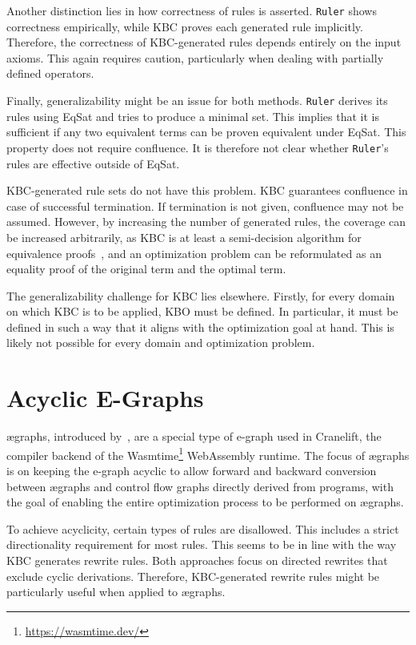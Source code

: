 Another distinction lies in how correctness of rules is asserted. \texttt{Ruler} shows correctness empirically, while KBC proves each generated rule implicitly. Therefore, the correctness of KBC-generated rules depends entirely on the input axioms. This again requires caution, particularly when dealing with partially defined operators.

Finally, generalizability might be an issue for both methods. \texttt{Ruler} derives its rules using EqSat and tries to produce a minimal set. This implies that it is sufficient if any two equivalent terms can be proven equivalent under EqSat. This property does not require confluence. It is therefore not clear whether \texttt{Ruler}'s rules are effective outside of EqSat.

KBC-generated rule sets do not have this problem. KBC guarantees confluence in case of successful termination. If termination is not given, confluence may not be assumed. However, by increasing the number of generated rules, the coverage can be increased arbitrarily, as KBC is at least a semi-decision algorithm for equivalence proofs~\citep{10.1093/comjnl/34.1.2}, and an optimization problem can be reformulated as an equality proof of the original term and the optimal term.

The generalizability challenge for KBC lies elsewhere. Firstly, for every domain on which KBC is to be applied, KBO must be defined. In particular, it must be defined in such a way that it aligns with the optimization goal at hand. This is likely not possible for every domain and optimization problem. 

\section{Acyclic E-Graphs}
ægraphs, introduced by~\cite{Fallin2023_aEGraphs}, are a special type of e-graph used in Cranelift, the compiler backend of the Wasmtime\footnote{\url{https://wasmtime.dev/}} WebAssembly runtime. The focus of ægraphs is on keeping the e-graph acyclic to allow forward and backward conversion between ægraphs and control flow graphs directly derived from programs, with the goal of enabling the entire optimization process to be performed on ægraphs.

To achieve acyclicity, certain types of rules are disallowed. This includes a strict directionality requirement for most rules. This seems to be in line with the way KBC generates rewrite rules. Both approaches focus on directed rewrites that exclude cyclic derivations. Therefore, KBC-generated rewrite rules might be particularly useful when applied to ægraphs.
